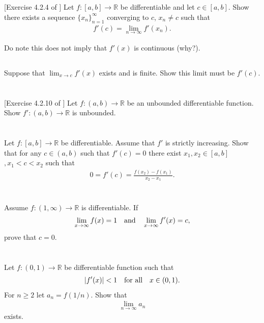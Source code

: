 \documentclass[11pt,letterpaper]{article}
\begin{document}
\section{}

\subsection{} [Exercise 4.2.4 of \cite{Lebl_23}] 
Let $f:[a,b]\to\mathbb{R}$ be differentiable and let $c\in[a,b]$. Show there exists a sequence $\{x_n\}^\infty_{n=1}$ converging to $c$, $x_n\neq c$ such that
\begin{align}
    f'(c) = \lim_{n\to\infty} f'(x_n).
\end{align}

Do note this does not imply that $f'(x)$ is continuous (why?).

\subsection{} 
Suppose that $\lim_{x\to c} f'(x)$ exists and is finite. Show this limit must be $f'(c)$.

\section{} [Exercise 4.2.10 of \cite{Lebl_23}] 
Let $f:(a,b)\to\mathbb{R}$ be an unbounded differentiable function. Show $f':(a,b)\to\mathbb{R}$ is unbounded.

\section{}
Let $f:[a,b]\to\mathbb{R}$ be differentiable. Assume that $f'$ is strictly increasing. Show that for any $c\in (a,b)$ such that $f'(c)=0$ there exist $x_1,x_2\in[a,b]$$, x_1<c<x_2$ such that
\begin{align}
    0 = f'(c) = \frac{f(x_2)-f(x_1)}{x_2-x_1}.
\end{align}

\section{}
Assume $f:(1,\infty)\to\mathbb{R}$ is differentiable. If
\begin{align}
    \lim_{x\to\infty} f(x)=1 \quad \mbox{and} \quad \lim_{x\to\infty} f'(x)=c,
\end{align}
prove that $c=0$.

\section{}
Let $f:(0,1)\to\mathbb{R}$ be differentiable function such that
\begin{align}
    |f'(x)|<1 \quad \mbox{for all} \quad x\in(0,1).
\end{align}
For $n\geq 2$ let $a_n = f(1/n)$. Show that
\begin{align}
    \lim_{n\to\infty} a_n
\end{align}
exists.
\end{document}

